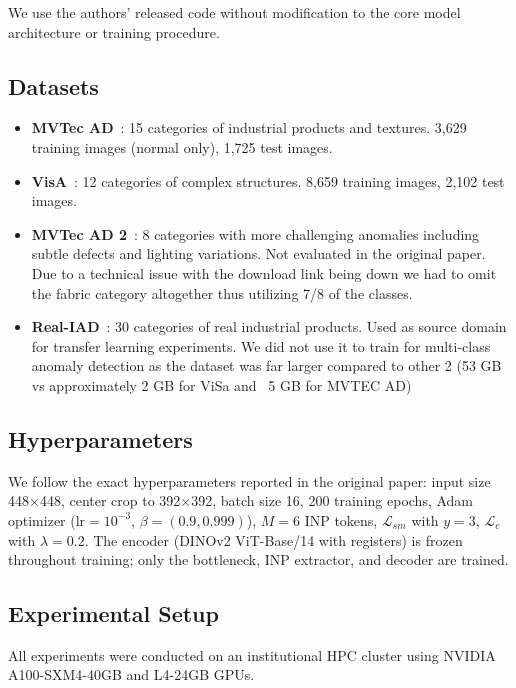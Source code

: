 \documentclass[10pt]{article} %
\begin{document}
We use the authors' released code without modification to the core model architecture or training procedure.

\subsection{Datasets}

\begin{itemize}
    \item \textbf{MVTec AD}~\citep{bergmann2019mvtec}: 15 categories of industrial products and textures. 3,629 training images (normal only), 1,725 test images.
    \item \textbf{VisA}~\citep{zou2022visa}: 12 categories of complex structures. 8,659 training images, 2,102 test images.
    \item \textbf{MVTec AD 2}~\citep{mvtecad2_2024}: 8 categories with more challenging anomalies including subtle defects and lighting variations. Not evaluated in the original paper. Due to a technical issue with the download link being down we had to omit the fabric category altogether thus utilizing 7/8 of the classes.
    \item \textbf{Real-IAD}~\citep{realiad2024}: 30 categories of real industrial products. Used as source domain for transfer learning experiments. We did not use it to train for multi-class anomaly detection as the dataset was far larger compared to other 2 (53 GB vs approximately 2 GB for ViSa and ~5 GB for MVTEC AD)
\end{itemize}

\subsection{Hyperparameters}

We follow the exact hyperparameters reported in the original paper: input size 448$\times$448, center crop to 392$\times$392, batch size 16, 200 training epochs, Adam optimizer ($\text{lr}=10^{-3}$, $\beta=(0.9, 0.999)$), $M=6$ INP tokens, $\mathcal{L}_{sm}$ with $y=3$, $\mathcal{L}_c$ with $\lambda=0.2$. The encoder (DINOv2 ViT-Base/14 with registers) is frozen throughout training; only the bottleneck, INP extractor, and decoder are trained.

\subsection{Experimental Setup}

All experiments were conducted on an institutional HPC cluster using NVIDIA A100-SXM4-40GB and L4-24GB GPUs.
\end{document}
